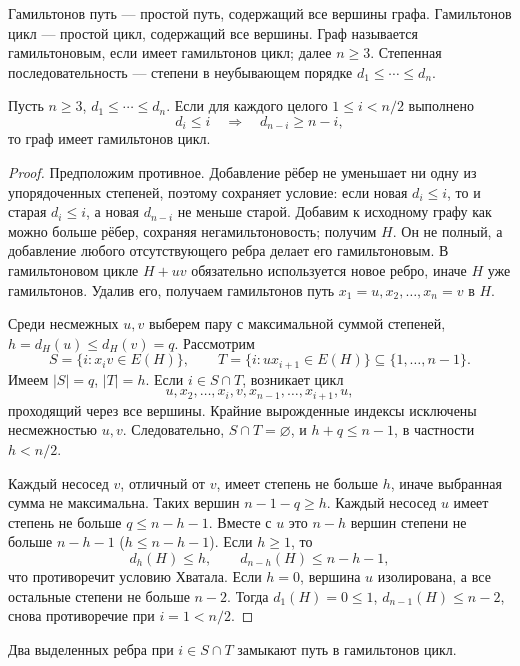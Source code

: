 \begin{definition}
Гамильтонов путь — простой путь, содержащий все вершины графа.
Гамильтонов цикл — простой цикл, содержащий все вершины.
Граф называется гамильтоновым, если имеет гамильтонов цикл; далее \(n\ge3\).
Степенная последовательность — степени в неубывающем порядке
\(d_1\le\cdots\le d_n\).
\end{definition}
\begin{theorem}[Хватал]
Пусть \(n\ge3\), \(d_1\le\cdots\le d_n\). Если для каждого целого
\(1\le i<n/2\) выполнено
\[
\boxed{d_i\le i\quad\Longrightarrow\quad d_{n-i}\ge n-i,}
\]
то граф имеет гамильтонов цикл.
\end{theorem}
\begin{proof}
Предположим противное. Добавление рёбер не уменьшает ни одну
из упорядоченных степеней, поэтому сохраняет условие: если новая
\(d_i\le i\), то и старая \(d_i\le i\), а новая \(d_{n-i}\) не меньше старой.
Добавим к исходному графу как можно больше рёбер, сохраняя негамильтоновость;
получим \(H\). Он не полный, а добавление любого отсутствующего ребра
делает его гамильтоновым. В гамильтоновом цикле \(H+uv\) обязательно
используется новое ребро, иначе \(H\) уже гамильтонов.
Удалив его, получаем гамильтонов путь
\(x_1=u,x_2,\ldots,x_n=v\) в \(H\).

Среди несмежных \(u,v\) выберем пару с максимальной суммой степеней,
\(h=d_H(u)\le d_H(v)=q\). Рассмотрим
\[
S=\{i:x_i v\in E(H)\},\qquad
T=\{i:u x_{i+1}\in E(H)\}\subseteq\{1,\ldots,n-1\}.
\]
Имеем \(|S|=q\), \(|T|=h\). Если \(i\in S\cap T\), возникает цикл
\[
u,x_2,\ldots,x_i,v,x_{n-1},\ldots,x_{i+1},u,
\]
проходящий через все вершины. Крайние вырожденные индексы исключены
несмежностью \(u,v\). Следовательно, \(S\cap T=\varnothing\), и
\(h+q\le n-1\), в частности \(h<n/2\).

Каждый несосед \(v\), отличный от \(v\), имеет степень не больше \(h\),
иначе выбранная сумма не максимальна. Таких вершин \(n-1-q\ge h\).
Каждый несосед \(u\) имеет степень не больше \(q\le n-h-1\).
Вместе с \(u\) это \(n-h\) вершин степени не больше \(n-h-1\)
(\(h\le n-h-1\)). Если \(h\ge1\), то
\[
d_h(H)\le h,\qquad d_{n-h}(H)\le n-h-1,
\]
что противоречит условию Хватала. Если \(h=0\), вершина \(u\) изолирована,
а все остальные степени не больше \(n-2\). Тогда
\(d_1(H)=0\le1\), \(d_{n-1}(H)\le n-2\), снова противоречие при \(i=1<n/2\).
\end{proof}

Два выделенных ребра при \(i\in S\cap T\) замыкают путь в гамильтонов цикл.

